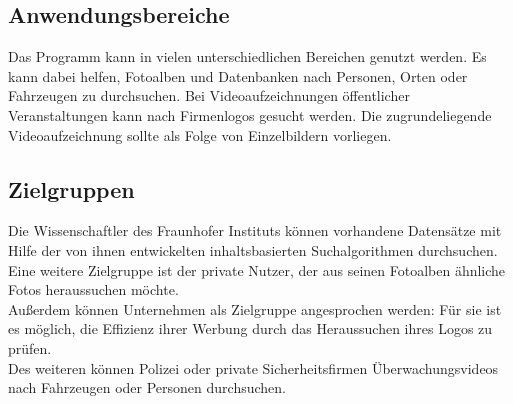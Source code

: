 \subsection{Anwendungsbereiche}

Das Programm kann in vielen unterschiedlichen Bereichen genutzt werden. Es kann dabei helfen, Fotoalben und Datenbanken nach Personen, Orten oder Fahrzeugen zu durchsuchen. Bei Videoaufzeichnungen öffentlicher Veranstaltungen kann nach Firmenlogos gesucht werden. Die zugrundeliegende Videoaufzeichnung sollte als Folge von Einzelbildern vorliegen.

\subsection{Zielgruppen}

Die Wissenschaftler des Fraunhofer Instituts können vorhandene Datensätze mit Hilfe der von ihnen entwickelten inhaltsbasierten Suchalgorithmen durchsuchen.\\
Eine weitere Zielgruppe ist der private Nutzer, der aus seinen Fotoalben ähnliche Fotos heraussuchen möchte.\\
Außerdem können Unternehmen als Zielgruppe angesprochen werden: Für sie ist es möglich, die Effizienz ihrer Werbung durch das Heraussuchen ihres Logos zu prüfen.\\
Des weiteren können Polizei oder private Sicherheitsfirmen Überwachungsvideos nach Fahrzeugen oder Personen durchsuchen.
\pagebreak